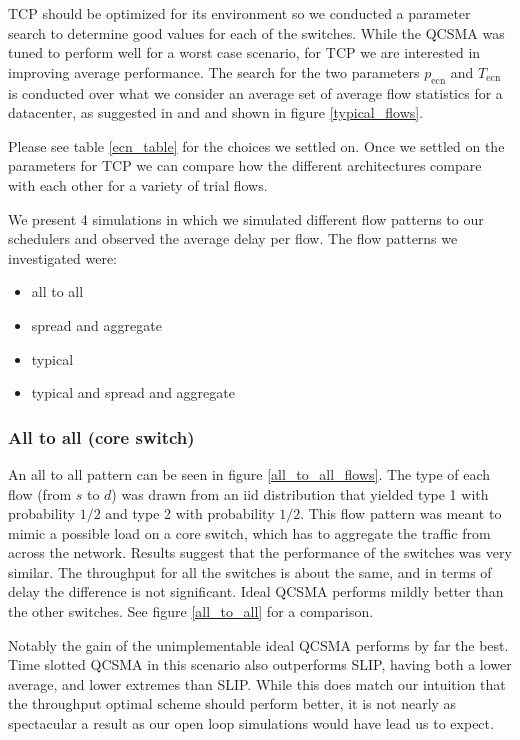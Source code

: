 \documentclass[11pt]{article}%
\begin{document}
  TCP should be optimized for its environment so we conducted a parameter search to determine good values for each of the switches.  While the QCSMA was tuned to perform well for a worst case scenario, for TCP we are interested in improving average performance.  The search for the two parameters $p_{\text{ecn}}$ and $T_{\text{ecn}}$ is conducted over what we consider an average set of average flow statistics for a datacenter, as suggested in \cite{Benson} and \cite{Kandula} and shown in figure \ref{typical_flows}.

Please see table \ref{ecn_table} for the choices we settled on.  Once we settled on the parameters for TCP we can compare how the different architectures compare with each other for a variety of trial flows.  


We present 4 simulations in which we simulated different flow patterns to our schedulers and observed the average delay per flow.  The flow patterns we investigated were:

\begin{itemize}
\item all to all 
\item spread and aggregate 
\item typical 
\item typical and spread and aggregate
\end{itemize}

\subsubsection{All to all (core switch)}
An all to all pattern can be seen in figure \ref{all_to_all_flows}.  The type of each flow (from $s$ to $d$) was drawn from an iid distribution that yielded type 1 with probability $1/2$ and type 2 with probability $1/2$.  This flow pattern was meant to mimic a possible load on a core switch, which has to aggregate the traffic from across the network.  Results suggest that the performance of the switches was very similar.  The throughput for all the switches is about the same, and in terms of delay the difference is not significant. Ideal QCSMA performs mildly better than the other switches.  See figure \ref{all_to_all} for a comparison.

Notably the gain of the unimplementable ideal QCSMA performs by far the best.  Time slotted QCSMA in this scenario also outperforms SLIP, having both a lower average, and lower extremes than SLIP.  While this does match our intuition that the throughput optimal scheme should perform better, it is not nearly as spectacular a result as our open loop simulations would have lead us to expect.
\end{document}
